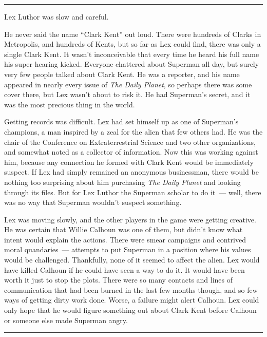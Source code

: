 \begin{center}\rule{0.5\linewidth}{0.5pt}\end{center}

Lex Luthor was slow and careful.

He never said the name ``Clark Kent'' out loud. There were hundreds of
Clarks in Metropolis, and hundreds of Kents, but so far as Lex could
find, there was only a single Clark Kent. It wasn't inconceivable that
every time he heard his full name his super hearing kicked. Everyone
chattered about Superman all day, but surely very few people talked
about Clark Kent. He was a reporter, and his name appeared in nearly
every issue of \emph{The Daily Planet}, so perhaps there was some cover
there, but Lex wasn't about to risk it. He had Superman's secret, and it
was the most precious thing in the world.

Getting records was difficult. Lex had set himself up as one of
Superman's champions, a man inspired by a zeal for the alien that few
others had. He was the chair of the Conference on Extraterrestrial
Science and two other organizations, and somewhat noted as a collector
of information. Now this was working against him, because any connection
he formed with Clark Kent would be immediately suspect. If Lex had
simply remained an anonymous businessman, there would be nothing too
surprising about him purchasing \emph{The Daily Planet} and looking
through its files. But for Lex Luthor the Superman scholar to do it~---
well, there was no way that Superman wouldn't suspect something.

Lex was moving slowly, and the other players in the game were getting
creative. He was certain that Willie Calhoun was one of them, but didn't
know what intent would explain the actions. There were smear campaigns
and contrived moral quandaries~--- attempts to put Superman in a
position where his values would be challenged. Thankfully, none of it
seemed to affect the alien. Lex would have killed Calhoun if he could
have seen a way to do it. It would have been worth it just to stop the
plots. There were so many contacts and lines of communication that had
been burned in the last few months though, and so few ways of getting
dirty work done. Worse, a failure might alert Calhoun. Lex could only
hope that he would figure something out about Clark Kent before Calhoun
or someone else made Superman angry.

\begin{center}\rule{0.5\linewidth}{0.5pt}\end{center}

